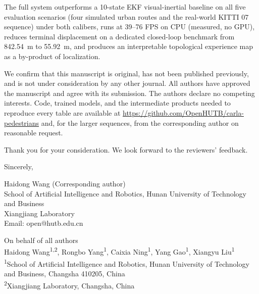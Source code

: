 \documentclass[11pt]{article}
\begin{document}
\vspace{0.6em}

The full system outperforms a 10-state EKF visual-inertial baseline on all five evaluation scenarios (four simulated urban routes and the real-world KITTI 07 sequence) under both calibers, runs at 39--76 FPS on CPU (measured, no GPU), reduces terminal displacement on a dedicated closed-loop benchmark from 842.54~m to 55.92~m, and produces an interpretable topological experience map as a by-product of localization.

\vspace{0.8em}

We confirm that this manuscript is original, has not been published previously, and is not under consideration by any other journal. All authors have approved the manuscript and agree with its submission. The authors declare no competing interests. Code, trained models, and the intermediate products needed to reproduce every table are available at \url{https://github.com/OpenHUTB/carla-pedestrians} and, for the larger sequences, from the corresponding author on reasonable request.

\vspace{0.8em}

Thank you for your consideration. We look forward to the reviewers' feedback.

\vspace{1.5em}

\noindent Sincerely,

\vspace{1.2em}

\noindent Haidong Wang (Corresponding author)\\
School of Artificial Intelligence and Robotics, Hunan University of Technology and Business\\
Xiangjiang Laboratory\\
Email: open@hutb.edu.cn

\vspace{1em}

\noindent On behalf of all authors\\
Haidong Wang\textsuperscript{1,2}, Rongbo Yang\textsuperscript{1}, Caixia Ning\textsuperscript{1}, Yang Gao\textsuperscript{1}, Xiangyu Liu\textsuperscript{1}\\
\textsuperscript{1}School of Artificial Intelligence and Robotics, Hunan University of Technology and Business, Changsha 410205, China\\
\textsuperscript{2}Xiangjiang Laboratory, Changsha, China
\end{document}
